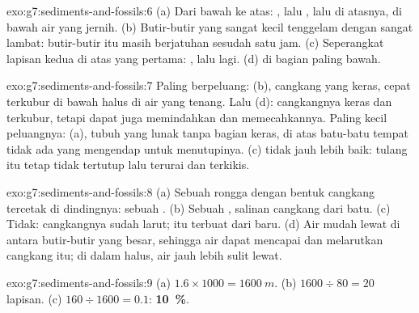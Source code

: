 \begin{solution}{exo:g7:sediments-and-fossils:6}
(a) Dari bawah ke atas: , lalu , lalu  di atasnya, di
bawah air yang jernih. (b) Butir-butir  yang sangat kecil tenggelam
dengan sangat lambat: butir-butir itu masih berjatuhan sesudah satu jam.
(c) Seperangkat lapisan kedua di atas yang pertama: , lalu 
lagi. (d)  di bagian paling bawah.
\end{solution}

\begin{solution}{exo:g7:sediments-and-fossils:7}
Paling berpeluang: (b), cangkang yang keras, cepat terkubur di bawah 
halus di air yang tenang. Lalu (d): cangkangnya keras dan terkubur, tetapi
 dapat juga memindahkan dan memecahkannya. Paling kecil peluangnya:
(a), tubuh yang lunak tanpa bagian keras, di atas batu-batu tempat tidak ada
 yang mengendap untuk menutupinya. (c) tidak jauh lebih baik: tulang
itu tetap tidak tertutup lalu terurai dan terkikis.
\end{solution}

\begin{solution}{exo:g7:sediments-and-fossils:8}
(a) Sebuah rongga dengan bentuk cangkang tercetak di dindingnya: sebuah
. (b) Sebuah , salinan cangkang dari batu. (c) Tidak:
cangkangnya sudah larut;  itu terbuat dari  baru. (d) Air
mudah lewat di antara butir-butir  yang besar, sehingga air dapat
mencapai dan melarutkan cangkang itu; di dalam  halus, air jauh
lebih sulit lewat.
\end{solution}

\begin{solution}{exo:g7:sediments-and-fossils:9}
(a) $1.6 \times 1000 = \qty{1600}{m}$. (b) $1600 \div 80 = 20$ lapisan.
(c) $160 \div 1600 = 0.1$: \textbf{10~\%}.
\end{solution}


